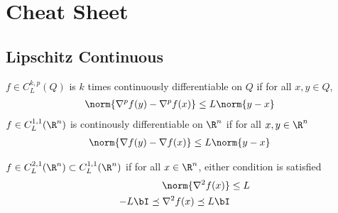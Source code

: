\documentclass[../summary.tex]{subfiles}
\begin{document}
\section{Cheat Sheet} 

\subsection{Lipschitz Continuous}
 
\begin{definition}
    $f\in C_{L}^{k,p}(Q)$ is $k$ times continuously differentiable on $Q$ if for all $x,y\in Q$,
    \begin{align}
        \norm{\nabla^p f(y) - \nabla^p f(x)} 
            &\leq L\norm{y-x}
            \label{eq:definition_lipschitz_continuity}
    \end{align} 
    $f\in C_{L}^{1,1}(\R^n)$ is continously differentiable on $\R^n$ if for all $x,y\in\R^n$
    \begin{align}
        \norm{\nabla f(y) - \nabla f(x)} 
            &\leq L\norm{y-x}
            \label{eq:definition_Lsmooth_bounded_gradient}
    \end{align}
\end{definition}

\begin{definition}
    $f\in C_L^{2,1}(\R^n) \subset C_{L}^{1,1}(\R^n)$ if for all $x\in\R^n$, either condition is satisfied
    \begin{align}
        \norm{\nabla^2 f(x)}
            &\leq L 
            \label{eq:definition_Lsmooth_bounded_hessian} \\
        -L\bI \preceq \nabla^2 f(x) \preceq L\bI 
            \label{eq:definition_Lsmooth_bounded_hessian_matrixineq}
    \end{align}
\end{definition}
\end{document}

